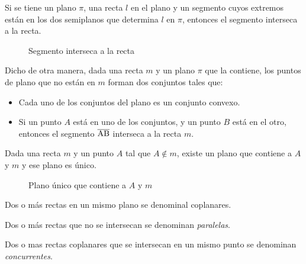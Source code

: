 \begin{postulate}
    Si se tiene un plano $\pi$, una recta $l$ en el plano y un segmento cuyos extremos están en los dos semiplanos que determina $l$ en $\pi$, entonces el segmento interseca a la recta.
    
    \begin{figure}[!h]
        \centering
        
        \caption{Segmento interseca a la recta}
        \label{fig:plot17}
    \end{figure}

    Dicho de otra manera, dada una recta $m$ y un plano $\pi$ que la contiene, los puntos de plano que no están en $m$ forman dos conjuntos tales que:

    \begin{itemize}
        \item Cada uno de los conjuntos del plano es un conjunto convexo.
        \item Si un punto $A$ está en uno de los conjuntos, y un punto $B$ está en el otro, entonces el segmento $\overline{\rm AB}$ interseca a la recta $m$.
    \end{itemize}
    
\end{postulate}

\begin{theorem}
    Dada una recta $m$ y un punto $A$ tal que $A \not \in m$, existe un plano que contiene a $A$ y $m$ y ese plano es único.
 
    \begin{figure}[!h]
        \centering
        
        \caption{Plano único que contiene a $A$ y $m$}
        \label{fig:theorem1}
    \end{figure}
        
\end{theorem}

\begin{definition}
Dos o más rectas en un mismo plano se denominal coplanares.
\end{definition}

\begin{definition}
Dos o más rectas que no se intersecan se denominan \textit{paralelas}.
\end{definition}

\begin{definition}
Dos o mas rectas coplanares que se intersecan en un mismo punto se denominan \textit{concurrentes}.
\end{definition}

